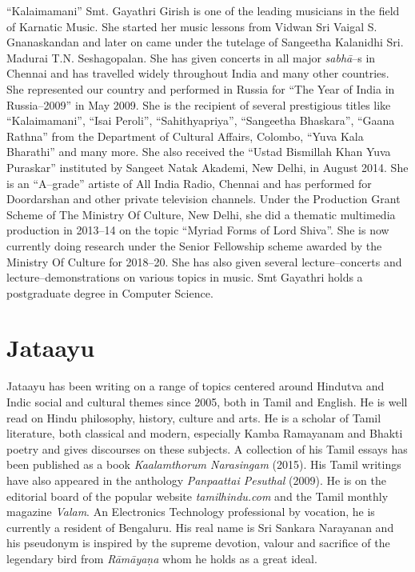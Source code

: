 “Kalaimamani” Smt. Gayathri Girish is one of the leading musicians in the field of Karnatic Music. She started her music lessons from Vidwan Sri Vaigal S. Gnanaskandan and later on came under the tutelage of Sangeetha Kalanidhi Sri. Madurai T.N. Seshagopalan. She has given concerts in all major \textit{sabhā}–s in Chennai and has travelled widely throughout India and many other countries. She represented our country and performed in Russia for “The Year of India in Russia–2009” in May 2009. She is the recipient of several prestigious titles like “Kalaimamani”, “Isai Peroli”, “Sahithyapriya”, “Sangeetha Bhaskara”, “Gaana Rathna” from the Department of Cultural Affairs, Colombo, “Yuva Kala Bharathi” and many more. She also received the “Ustad Bismillah Khan Yuva Puraskar” instituted by Sangeet Natak Akademi, New Delhi, in August 2014. She is an “A–grade” artiste of All India Radio, Chennai and has performed for Doordarshan and other private television channels. Under the Production Grant Scheme of The Ministry Of Culture, New Delhi, she did a thematic multimedia production in 2013–14 on the topic “Myriad Forms of Lord Shiva”. She is now currently doing research under the Senior Fellowship scheme awarded by the Ministry Of Culture for 2018–20. She has also given several lecture–concerts and lecture–demonstrations on various topics in music. Smt Gayathri holds a postgraduate degree in Computer Science.


\section*{Jataayu}

Jataayu has been writing on a range of topics centered around Hindutva and Indic social and cultural themes since 2005, both in Tamil and English. He is well read on Hindu philosophy, history, culture and arts. He is a scholar of Tamil literature, both classical and modern, especially Kamba Ramayanam and Bhakti poetry and gives discourses on these subjects. A collection of his Tamil essays has been published as a book \textit{Kaalamthorum Narasingam} (2015). His Tamil writings have also appeared in the anthology \textit{Panpaattai Pesuthal} (2009). He is on the editorial board of the popular website \textit{tamilhindu.com} and the Tamil monthly magazine \textit{Valam}. An Electronics Technology professional by vocation, he is currently a resident of Bengaluru. His real name is Sri Sankara Narayanan and his pseudonym is inspired by the supreme devotion, valour and sacrifice of the legendary bird from \textit{Rāmāyaṇa} whom he holds as a great ideal.



